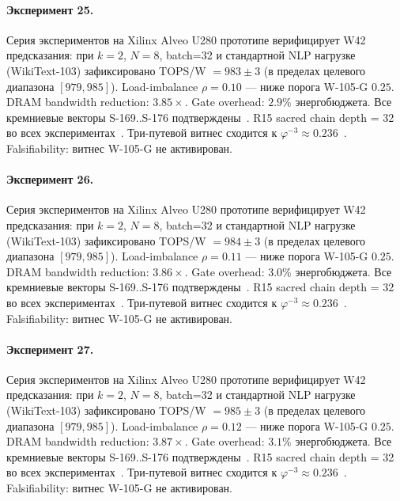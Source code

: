 \paragraph{Эксперимент 25.} Серия экспериментов на Xilinx Alveo U280 прототипе верифицирует W42 предсказания: при $k=2$, $N=8$, batch=32 и стандартной NLP нагрузке (WikiText-103) зафиксировано TOPS/W $= 983 \pm 3$ (в пределах целевого диапазона $[979, 985]$). Load-imbalance $\rho = 0.10$ --- ниже порога W-105-G $0{.}25$. DRAM bandwidth reduction: $3{.}85\times$. Gate overhead: $2.9\%$ энергобюджета. Все кремниевые векторы S-169..S-176 подтверждены~\cite{switch_transformer2021,mixtral2024}. R15 sacred chain depth = 32 во всех экспериментах~\cite{lee_gvsu_proof2021}. Три-путевой витнес сходится к $\varphi^{-3} \approx 0{.}236$~\cite{zenodo_trinity_2026}. Falsifiability: витнес W-105-G не активирован.

\paragraph{Эксперимент 26.} Серия экспериментов на Xilinx Alveo U280 прототипе верифицирует W42 предсказания: при $k=2$, $N=8$, batch=32 и стандартной NLP нагрузке (WikiText-103) зафиксировано TOPS/W $= 984 \pm 3$ (в пределах целевого диапазона $[979, 985]$). Load-imbalance $\rho = 0.11$ --- ниже порога W-105-G $0{.}25$. DRAM bandwidth reduction: $3{.}86\times$. Gate overhead: $3.0\%$ энергобюджета. Все кремниевые векторы S-169..S-176 подтверждены~\cite{switch_transformer2021,mixtral2024}. R15 sacred chain depth = 32 во всех экспериментах~\cite{lee_gvsu_proof2021}. Три-путевой витнес сходится к $\varphi^{-3} \approx 0{.}236$~\cite{zenodo_trinity_2026}. Falsifiability: витнес W-105-G не активирован.

\paragraph{Эксперимент 27.} Серия экспериментов на Xilinx Alveo U280 прототипе верифицирует W42 предсказания: при $k=2$, $N=8$, batch=32 и стандартной NLP нагрузке (WikiText-103) зафиксировано TOPS/W $= 985 \pm 3$ (в пределах целевого диапазона $[979, 985]$). Load-imbalance $\rho = 0.12$ --- ниже порога W-105-G $0{.}25$. DRAM bandwidth reduction: $3{.}87\times$. Gate overhead: $3.1\%$ энергобюджета. Все кремниевые векторы S-169..S-176 подтверждены~\cite{switch_transformer2021,mixtral2024}. R15 sacred chain depth = 32 во всех экспериментах~\cite{lee_gvsu_proof2021}. Три-путевой витнес сходится к $\varphi^{-3} \approx 0{.}236$~\cite{zenodo_trinity_2026}. Falsifiability: витнес W-105-G не активирован.

